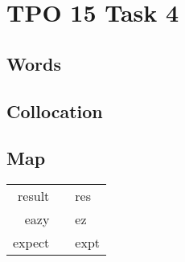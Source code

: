 \section{TPO 15 Task 4}

\subsection{Words}

\subsection{Collocation}

\subsection{Map}

\begin{tabular}{rc@{\quad$\to$\quad}l}
    result && res\\
    eazy && ez\\
    expect && expt\\
\end{tabular}

\newpage
